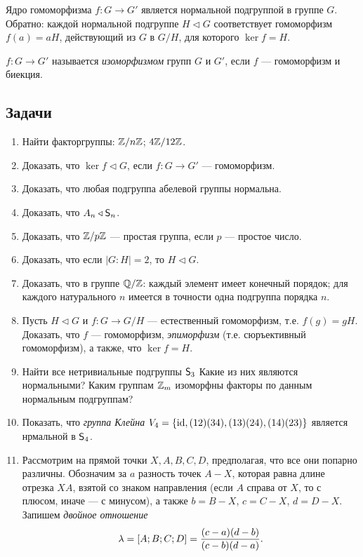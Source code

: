 Ядро гомоморфизма $f:G\to G'$ является нормальной подгруппой в группе $G$. Обратно: каждой нормальной подгруппе $H\triangleleft G$ соответствует гомоморфизм $f(a)=aH$, действующий из $G$ в $G/H$, для которого $\ker f=H$.

$f:G\to G'$ называется \textit{изоморфизмом} групп $G$ и $G'$, если $f$ --- гомоморфизм и биекция.



\subsection*{Задачи}

\begin{enumerate}
\item Найти факторгруппы: \ipunkt $\mathbb Z/n\mathbb Z$; \ipunkt $4\mathbb Z/12\mathbb Z$.
\item Доказать, что $\ker f\triangleleft G$, если $f:G\to G'$ --- гомоморфизм.

\item Доказать, что любая подгруппа абелевой группы нормальна.
\item Доказать, что $A_n\triangleleft {\mathsf{S}}_n$.

\item Доказать, что $\mathbb Z/p\mathbb Z$ --- простая группа, если $p$ --- простое число.

\item Доказать, что если $|G:H|=2$, то $H\triangleleft G$.

\item Доказать, что в группе $\mathbb Q/\mathbb Z$: \ipunkt каждый элемент имеет конечный порядок; \ipunkt для каждого натурального $n$ имеется в точности одна подгруппа порядка $n$.

\item Пусть $H\triangleleft G$ и $f:G\to G/H$ --- естественный гомоморфизм, т.е. $f(g)=gH$. Доказать, что $f$ --- гомоморфизм, \textit{эпиморфизм} (т.е. сюръективный гомоморфизм), а также, что $\ker f=H$.

\item Найти все нетривиальные подгруппы ${\mathsf{S}}_3$ Какие из них являются нормальными? Каким группам $\mathbb Z_m$ изоморфны факторы по данным нормальным подгруппам?

\item Показать, что \textit{группа Клейна} $V_4=\{\mathrm{id},(12)(34), (13)(24), (14)(23)\}$ является нрмальной в ${\mathsf{S}}_4$.

\item Рассмотрим на прямой точки $X,A,B,C,D$, предполагая, что все они попарно различны. Обозначим за $a$ разность точек $A-X$, которая равна длине отрезка $XA$, взятой со знаком направления (если $A$ справа от $X$, то с плюсом, иначе --- с минусом), а также $b=B-X$, $c=C-X$, $d=D-X$. Запишем \textit{двойное отношение}
$$
\lambda = [A;B;C;D] = \frac{(c-a)(d-b)}{(c-b)(d-a)}.
$$


\end{enumerate}
